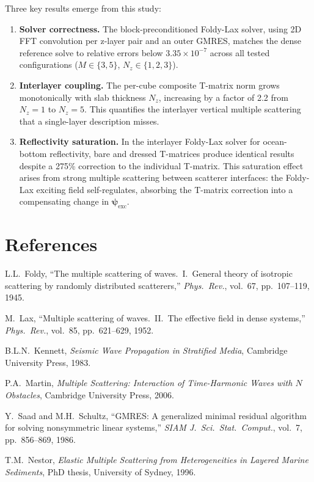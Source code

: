 \documentclass[11pt,a4paper]{article}
\theoremstyle{plain}
\theoremstyle{remark}
\begin{document}
Three key results emerge from this study:

\begin{enumerate}
\item \textbf{Solver correctness.}  The block-preconditioned Foldy-Lax
  solver, using 2D FFT convolution per z-layer pair and an outer GMRES,
  matches the dense reference solve to relative errors below
  $3.35 \times 10^{-7}$ across all tested configurations
  ($M \in \{3, 5\}$, $N_z \in \{1, 2, 3\}$).

\item \textbf{Interlayer coupling.}  The per-cube composite T-matrix
  norm grows monotonically with slab thickness $N_z$, increasing by a
  factor of 2.2 from $N_z = 1$ to $N_z = 5$.  This quantifies the
  interlayer vertical multiple scattering that a single-layer
  description misses.

\item \textbf{Reflectivity saturation.}  In the interlayer Foldy-Lax
  solver for ocean-bottom reflectivity, bare and dressed T-matrices
  produce identical results despite a 275\% correction to the individual
  T-matrix.  This saturation effect arises from strong multiple
  scattering between scatterer interfaces: the Foldy-Lax exciting
  field self-regulates, absorbing the T-matrix correction into a
  compensating change in $\bm{\psi}_{\mathrm{exc}}$.
\end{enumerate}

\section*{References}

\begin{enumerate}[label={[\arabic*]},nosep]
  \item L.L.\ Foldy, ``The multiple scattering of waves.\ I.\ General
    theory of isotropic scattering by randomly distributed scatterers,''
    \emph{Phys.\ Rev.}, vol.~67, pp.~107--119, 1945.
  \item M.\ Lax, ``Multiple scattering of waves.\ II.\ The effective
    field in dense systems,'' \emph{Phys.\ Rev.}, vol.~85,
    pp.~621--629, 1952.
  \item B.L.N.\ Kennett, \emph{Seismic Wave Propagation in Stratified
    Media}, Cambridge University Press, 1983.
  \item P.A.\ Martin, \emph{Multiple Scattering: Interaction of
    Time-Harmonic Waves with $N$ Obstacles}, Cambridge University
    Press, 2006.
  \item Y.\ Saad and M.H.\ Schultz, ``GMRES: A generalized minimal
    residual algorithm for solving nonsymmetric linear systems,''
    \emph{SIAM J.\ Sci.\ Stat.\ Comput.}, vol.~7, pp.~856--869, 1986.
  \item T.M.\ Nestor, \emph{Elastic Multiple Scattering from
    Heterogeneities in Layered Marine Sediments}, PhD thesis,
    University of Sydney, 1996.
\end{enumerate}
\end{document}
